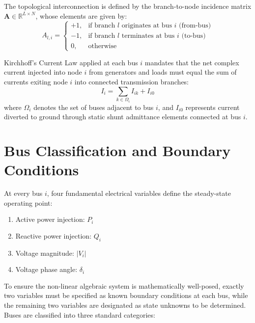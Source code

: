 \documentclass[12pt,a4paper,oneside]{report}
\begin{document}
The topological interconnection is defined by the branch-to-node incidence matrix $\mathbf{A} \in \mathbb{R}^{L \times N}$, whose elements are given by:
\begin{equation}
A_{l,i} = \begin{cases}
+1, & \text{if branch } l \text{ originates at bus } i \text{ (from-bus)} \\
-1, & \text{if branch } l \text{ terminates at bus } i \text{ (to-bus)} \\
0, & \text{otherwise}
\end{cases}
\end{equation}

Kirchhoff's Current Law applied at each bus $i$ mandates that the net complex current injected into node $i$ from generators and loads must equal the sum of currents exiting node $i$ into connected transmission branches:
\begin{equation}
I_i = \sum_{k \in \Omega_i} I_{ik} + I_{i0}
\end{equation}
where $\Omega_i$ denotes the set of buses adjacent to bus $i$, and $I_{i0}$ represents current diverted to ground through static shunt admittance elements connected at bus $i$.

\section{Bus Classification and Boundary Conditions}
At every bus $i$, four fundamental electrical variables define the steady-state operating point:
\begin{enumerate}
    \item Active power injection: $P_i$
    \item Reactive power injection: $Q_i$
    \item Voltage magnitude: $|V_i|$
    \item Voltage phase angle: $\delta_i$
\end{enumerate}

To ensure the non-linear algebraic system is mathematically well-posed, exactly two variables must be specified as known boundary conditions at each bus, while the remaining two variables are designated as state unknowns to be determined. Buses are classified into three standard categories:
\end{document}
